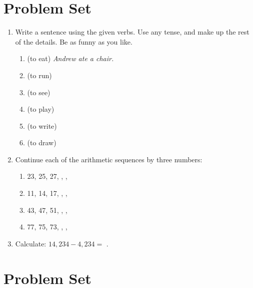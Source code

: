\documentclass{tufte-book}
\begin{document}
\clearpage\section{Problem Set }

\begin{enumerate}
  \item Write a sentence using the given verbs. Use any tense, and make up the rest of the details.
  Be as funny as you like.
  \begin{enumerate}\bigskip
    \item (to eat) \textit{Andrew ate a chair.}\bigskip
    \item (to run) \dotfill\bigskip
    \item (to see) \dotfill\bigskip
    \item (to play) \dotfill\bigskip
    \item (to write) \dotfill\bigskip
    \item (to draw) \dotfill
  \end{enumerate}
  \item Continue each of the arithmetic sequences by three numbers:
  \begin{enumerate}\bigskip
    \item 23, 25, 27, \dotfill, \dotfill, \dotfill\bigskip
    \item 11, 14, 17, \dotfill, \dotfill, \dotfill\bigskip
    \item 43, 47, 51, \dotfill, \dotfill, \dotfill\bigskip
    \item 77, 75, 73, \dotfill, \dotfill, \dotfill
  \end{enumerate}
  \bigskip
  \item Calculate: $14,234 - 4,234 =$ \dotfill.
\end{enumerate}

\clearpage\section{Problem Set }
\end{document}
